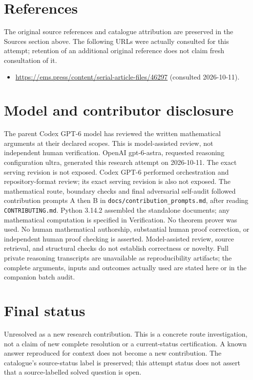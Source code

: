 \documentclass[11pt]{article}
\begin{document}
\section{References}
The original source references and catalogue attribution are preserved in the
Sources section above. The following URLs were actually consulted for this attempt;
retention of an additional original reference does not claim fresh consultation of it.
\begin{itemize}
\item \url{https://ems.press/content/serial-article-files/46297} (consulted 2026-10-11). 
\end{itemize}
\section{Model and contributor disclosure}
The parent Codex GPT-6 model has reviewed the written mathematical arguments at their declared scopes. This is model-assisted review, not independent human verification.
OpenAI gpt-6-astra, requested reasoning configuration ultra, generated this research
attempt on 2026-10-11. The exact serving revision is not exposed. Codex GPT-6
performed orchestration and repository-format review; its exact serving revision
is also not exposed. The mathematical route, boundary checks and final adversarial
self-audit followed contribution prompts A then B in
\texttt{docs/contribution\_prompts.md}, after reading \texttt{CONTRIBUTING.md}.
Python 3.14.2 assembled the standalone documents; any mathematical computation is
specified in Verification. No theorem prover was used. No human mathematical
authorship, substantial human proof correction, or independent human proof checking
is asserted. Model-assisted review, source retrieval, and structural checks do not
establish correctness or novelty. Full private reasoning transcripts are unavailable
as reproducibility artifacts; the complete arguments, inputs and outcomes actually
used are stated here or in the companion batch audit.
\section{Final status}
Unresolved as a new research contribution. This is a concrete route investigation,
not a claim of new complete resolution or a current-status certification. A known
answer reproduced for context does not become a new contribution. The catalogue's
source-status label is preserved; this attempt status does not assert that a
source-labelled solved question is open.
\end{document}
